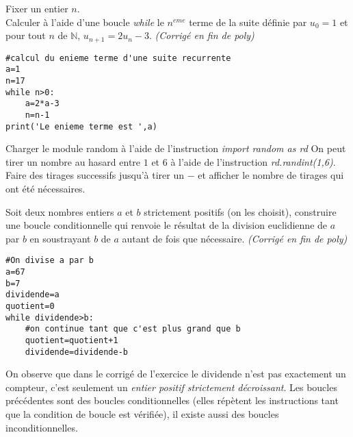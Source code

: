 \begin{Exercise}[title={Construire une boucle conditionnelle},counter={exo},label=exorec]
Fixer un entier $n$.\\
Calculer à l'aide d'une boucle \textit{while} le $n^{eme}$ terme de la suite définie par $u_0=1$ et pour tout $n$ de $\mathbb{N}$, $u_{n+1}=2u_n-3$. \textit{(Corrigé en fin de poly)}
\end{Exercise}

\begin{Answer}
\begin{lstlisting}[frame=lines, caption={$n^{eme}$ terme}]
#calcul du enieme terme d'une suite recurrente
a=1
n=17
while n>0:
	a=2*a-3
	n=n-1
print('Le enieme terme est ',a)  
\end{lstlisting} 
\end{Answer}

\begin{Exercise}[title={Première apparition},counter={exo}]
Charger le module random à l'aide de l'instruction \textit{import random as rd} On peut tirer un nombre au hasard entre $1$ et $6$ à l'aide de l'instruction \textit{rd.randint(1,6)}. Faire des tirages successifs jusqu'à tirer un $-$ et afficher le nombre de tirages qui ont été nécessaires. 
\end{Exercise}

\begin{Exercise}[title={Construire une boucle conditionnelle sans utiliser de compteur: division naïve},counter={exo},label=exonaif]
  Soit deux nombres entiers $a$ et $b$ strictement positifs (on les choisit), construire une boucle conditionnelle qui renvoie le résultat de la division euclidienne de $a$ par $b$ en soustrayant $b$ de $a$ autant de fois que nécessaire. \textit{(Corrigé en fin de poly)}
\end{Exercise}

\begin{Answer}[ref=exonaif]
\begin{lstlisting}[frame=lines, caption={division naïve}, label=premcode4]
#On divise a par b
a=67
b=7
dividende=a
quotient=0
while dividende>b:
    #on continue tant que c'est plus grand que b 
    quotient=quotient+1
    dividende=dividende-b
\end{lstlisting} 
\end{Answer}

On observe que dans le corrigé de l'exercice \label{exonaif} le dividende n'est pas exactement un compteur, c'est seulement un \emph{entier positif strictement décroissant}. Les boucles précédentes sont des boucles conditionnelles (elles répètent les instructions tant que la condition de boucle est vérifiée), il existe aussi des boucles inconditionnelles.

